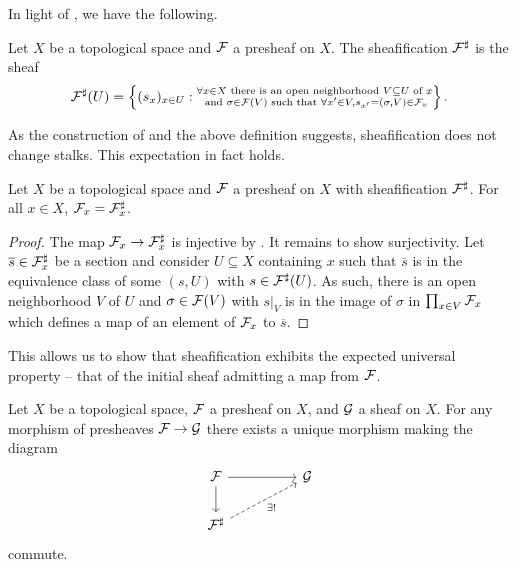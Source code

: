 In light of , we have the following. 
\begin{definition}[Sheafification]\label{def: sheafification}
    Let $X$ be a topological space and $\mathcal{F}$ a presheaf on $X$. The sheafification $\mathcal{F}^{\sharp}$ is the sheaf 
    $$\mathcal{F}^{\sharp}(U)=\left\{(s_{x})_{x\in U}:\substack{\forall x\in X \text{ there is an open neighborhood }V\subseteq U\text{ of }x \\ \text{ and }\sigma\in\mathcal{F}(V)\text{ such that }\forall x'\in V, s_{x'}=(\sigma,V)\in\mathcal{F}_{v}}\right\}.$$
\end{definition}
As the construction of  and the above definition suggests, sheafification does not change stalks. This expectation in fact holds. 
\begin{proposition}\label{prop: sheafification does not change stalks}
    Let $X$ be a topological space and $\mathcal{F}$ a presheaf on $X$ with sheafification $\mathcal{F}^{\sharp}$. For all $x\in X$, $\mathcal{F}_{x}=\mathcal{F}^{\sharp}_{x}$.
\end{proposition}
\begin{proof}
    The map $\mathcal{F}_{x}\to\mathcal{F}_{x}^{\sharp}$ is injective by . It remains to show surjectivity. Let $\overline{s}\in\mathcal{F}_{x}^{\sharp}$ be a section and consider $U\subseteq X$ containing $x$ such that $\overline{s}$ is in the equivalence class of some $(s,U)$ with $s\in\mathcal{F}^{\sharp}(U)$. As such, there is an open neighborhood $V$ of $U$ and $\sigma\in\mathcal{F}(V)$ with $s|_{V}$ is in the image of $\sigma$ in $\prod_{x\in V}\mathcal{F}_{x}$ which defines a map of an element of $\mathcal{F}_{x}$ to $\overline{s}$. 
\end{proof}
This allows us to show that sheafification exhibits the expected universal property -- that of the initial sheaf admitting a map from $\mathcal{F}$. 
\begin{proposition}\label{prop: universal property of sheafification}
    Let $X$ be a topological space, $\mathcal{F}$ a presheaf on $X$, and $\mathcal{G}$ a sheaf on $X$. For any morphism of presheaves $\mathcal{F}\to\mathcal{G}$ there exists a unique morphism making the diagram 
    $$%
    \begin{tikzcd}
        \Fcal && \Gcal \\
        {\Fcal^{\sharp}}
        \arrow[from=1-1, to=1-3]
        \arrow[from=1-1, to=2-1]
        \arrow["{\exists!}"', dashed, from=2-1, to=1-3]
    \end{tikzcd}$$
    commute. 
\end{proposition}
